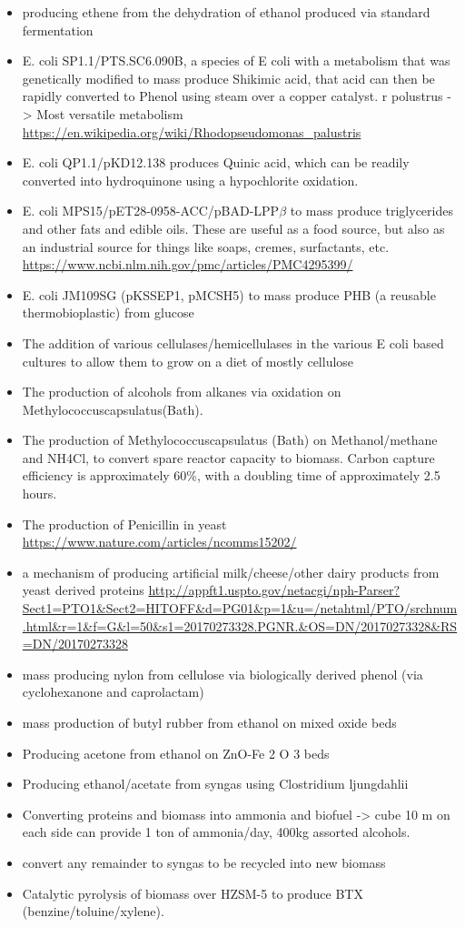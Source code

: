 \documentclass[10pt]{article}
\begin{document}
\begin{itemize}
    \item producing ethene from the dehydration of ethanol produced via standard fermentation
    \item E. coli SP1.1/PTS.SC6.090B, a species of E coli with a metabolism that was genetically modified to mass produce Shikimic acid, that acid can then be rapidly converted to Phenol using steam over a copper catalyst. 
r polustrus -> Most versatile metabolism \url{https://en.wikipedia.org/wiki/Rhodopseudomonas_palustris}
    \item E. coli QP1.1/pKD12.138 produces Quinic acid, which can be readily converted into hydroquinone using a hypochlorite oxidation. 
    \item E. coli MPS15/pET28-0958-ACC/pBAD-LPP$\beta$ to mass produce triglycerides and other fats and edible oils. These are useful as a food source, but also as an industrial source for things like soaps, cremes, surfactants, etc. \url{https://www.ncbi.nlm.nih.gov/pmc/articles/PMC4295399/}
    \item E. coli JM109SG (pKSSEP1, pMCSH5) to mass produce PHB (a reusable thermobioplastic) from glucose
    \item The addition of various cellulases/hemicellulases in the various E coli based cultures to allow them to grow on a diet of mostly cellulose
    \item The production of alcohols from alkanes via oxidation on Methylococcuscapsulatus(Bath).
    \item The production of Methylococcuscapsulatus (Bath) on Methanol/methane and NH4Cl, to convert spare reactor capacity to biomass. Carbon capture efficiency is approximately 60\%, with a doubling time of approximately 2.5 hours.
    \item The production of Penicillin in yeast \url{https://www.nature.com/articles/ncomms15202/}
    \item  a mechanism of producing artificial milk/cheese/other dairy products from yeast derived proteins \url{http://appft1.uspto.gov/netacgi/nph-Parser?Sect1=PTO1&Sect2=HITOFF&d=PG01&p=1&u=/netahtml/PTO/srchnum.html&r=1&f=G&l=50&s1=20170273328.PGNR.&OS=DN/20170273328&RS=DN/20170273328}
    \item mass producing nylon from cellulose via biologically derived phenol (via cyclohexanone and caprolactam)
    \item mass production of butyl rubber from ethanol on mixed oxide beds
    \item Producing acetone from ethanol on ZnO-Fe 2 O 3 beds
    \item Producing ethanol/acetate from syngas using Clostridium ljungdahlii 
    \item Converting proteins and biomass into ammonia and biofuel -> cube 10 m on each side can provide 1 ton of ammonia/day, 400kg assorted alcohols.
    \item convert any remainder to syngas to be recycled into new biomass
    \item Catalytic pyrolysis of biomass over HZSM-5 to produce BTX (benzine/toluine/xylene).
\end{itemize}
\end{document}
